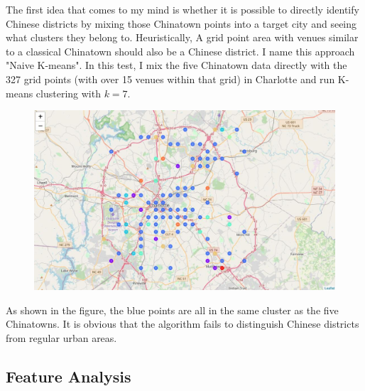 \documentclass{article}
\begin{document}
The first idea that comes to my mind is whether it is possible to directly identify Chinese districts by mixing those Chinatown points into a target city and seeing what clusters they belong to.
Heuristically, A grid point area with venues similar to a classical Chinatown should also be a Chinese district.
I name this approach "Naive K-means".
In this test, I mix the five Chinatown data directly with the 327 grid points (with over 15 venues within that grid) in Charlotte and run K-means clustering with $k=7$.

\begin{figure}[h!]
\includegraphics[width=1.0\textwidth]{cn1.jpg}
\centering
\end{figure}

As shown in the figure, the blue points are all in the same cluster as the five Chinatowns.
It is obvious that the algorithm fails to distinguish Chinese districts from regular urban areas.

\newpage

\subsection{Feature Analysis}
\end{document}
